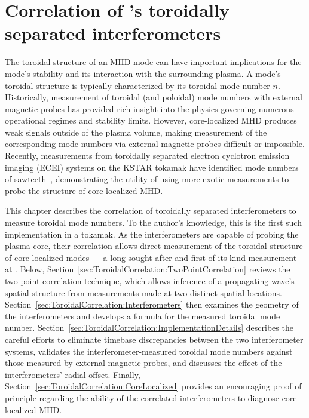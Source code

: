 \newcommand{\meas}{\text{meas}}
\newcommand{\nom}{\text{nom}}
\newcommand{\trig}{\text{trig}}
\newcommand{\Ny}{\text{Ny}}


\chapter{Correlation of \diiid's toroidally separated interferometers}
\label{ch:ToroidalCorrelation}
The toroidal structure of an MHD mode can have important implications
for the mode's stability and its interaction with the surrounding plasma.
A mode's toroidal structure is typically characterized
by its toroidal mode number $n$.
Historically, measurement of toroidal (and poloidal) mode numbers
with external magnetic probes has provided rich insight
into the physics governing numerous operational regimes and stability limits.
However, core-localized MHD produces weak signals outside of the plasma volume,
making measurement of the corresponding mode numbers
via external magnetic probes difficult or impossible.
Recently, measurements from toroidally separated
electron cyclotron emission imaging (ECEI) systems
on the KSTAR tokamak have identified mode numbers of
sawteeth~\cite{choe_nf_2015},
demonstrating the utility of using more exotic measurements
to probe the structure of core-localized MHD.

This chapter describes the correlation
of toroidally separated interferometers
to measure toroidal mode numbers.
To the author's knowledge,
this is the first such implementation in a tokamak.
As the interferometers are capable of probing the plasma core,
their correlation allows direct measurement
of the toroidal structure of core-localized modes
--- a long-sought after and first-of-its-kind measurement at \diiid.
Below, Section~\ref{sec:ToroidalCorrelation:TwoPointCorrelation}
reviews the two-point correlation technique,
which allows inference of a propagating wave's
spatial structure from measurements
made at two distinct spatial locations.
Section~\ref{sec:ToroidalCorrelation:Interferometers}
then examines the geometry of the interferometers and
develops a formula for the measured toroidal mode number.
Section~\ref{sec:ToroidalCorrelation:ImplementationDetails}
describes the careful efforts to eliminate timebase discrepancies
between the two interferometer systems,
validates the interferometer-measured toroidal mode numbers
against those measured by external magnetic probes, and
discusses the effect of the interferometers' radial offset.
Finally, Section~\ref{sec:ToroidalCorrelation:CoreLocalized}
provides an encouraging proof of principle
regarding the ability of the correlated interferometers
to diagnose core-localized MHD.


